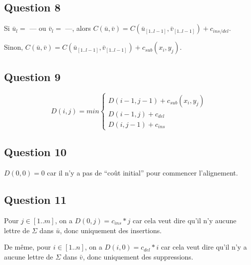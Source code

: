 \documentclass{report}
\begin{document}
\subsection*{Question 8}
Si $\bar{u}_{l} = $ --- ou $\bar{v}_{l} = $ ---, alors $C(\bar{u}, \bar{v}) = C(\bar{u}_{[1..l-1]}, \bar{v}_{[1..l-1]}) + c_{ins/del}$.

Sinon, $C(\bar{u}, \bar{v}) = C(\bar{u}_{[1..l-1]}, \bar{v}_{[1..l-1]}) + c_{sub}(x_{i},y_{j})$.


\subsection*{Question 9}
$$
D(i,j)= min\left\{
    \begin{array}{ll}
        D(i-1,j-1) + c_{sub}(x_{i},y_{j}) \\
        D(i-1,j) +  c_{del}\\
        D(i,j-1) +  c_{ins} 
    \end{array}
\right.
$$

\subsection*{Question 10}
$D(0,0)=0$  car il n'y a pas de ``coût initial'' pour commencer l'alignement.

\subsection*{Question 11}
Pour $j\in[1..m]$, on a $D(0,j)=c_{ins}*j$ car cela veut dire qu'il n'y aucune lettre de $ \Sigma$ dans $\bar{u}$, donc uniquement des insertions.

De même, pour  $i\in[1..n]$, on a $D(i,0)=c_{del}*i$ car cela veut dire qu'il n'y a  aucune lettre de $ \Sigma$ dans $\bar{v}$, donc uniquement des suppressions.

\clearpage
\end{document}
